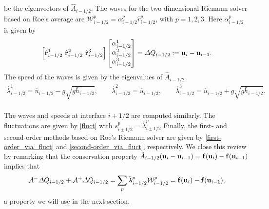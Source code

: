 \documentclass[preprint, 11pt]{article}
\newcommand{\W}{{\mathcal W}}
\newcommand{\A}{{\mathcal A}}
\newcommand{\bff}{{\bf f}}
\newcommand{\bfr}{{\bf r}}
\newcommand{\bfu}{{\bf u}}
\begin{document}
be the eigenvectors of $\hat A_{i-1/2}$.
The waves for the two-dimensional Riemann solver based on Roe's average are
$\W_{i-1/2}^p=\alpha_{i-1/2}^p\hat r_{i-1/2}^p$, with $p=1,2,3$. Here $\alpha_{i-1/2}^p$ is given by
\begin{align}\label{system_for_alphas}
  \left[\hat \bfr^1_{i-1/2} ~\hat \bfr^2_{i-1/2} ~\hat \bfr^3_{i-1/2}\right]
  \begin{bmatrix}
    \alpha^1_{i-1/2} \\
    \alpha^2_{i-1/2} \\
    \alpha^3_{i-1/2}
  \end{bmatrix}
  =\Delta Q_{i-1/2}:=\bfu_i-\bfu_{i-1}.
\end{align}
The speed of the waves is given by the eigenvalues of $\hat A_{i-1/2}$
\begin{align*}
  \hat\lambda_{i-1/2}^1=\hat u_{i-1/2}-g\sqrt{g\bar h_{i-1/2}}, \qquad
  \hat\lambda_{i-1/2}^2=\hat u_{i-1/2}, \qquad
  \hat\lambda_{i-1/2}^3=\hat u_{i-1/2}+g\sqrt{g\bar h_{i-1/2}}. \\
\end{align*}

The waves and speeds at interface $i+1/2$ are computed similarly.
The fluctuations are given by \eqref{fluct} with $s_{i\pm 1/2}^p=\hat\lambda_{i\pm 1/2}^p$
Finally, the first- and second-order methods based on Roe's Riemann solver are given by
\eqref{first-order_via_fluct} and \eqref{second-order_via_fluct}, respectively.
We close this review by remarking that the conservation property
$\hat A_{i-1/2}(\bfu_i-\bfu_{i-1})=\bff(\bfu_i)-\bff(\bfu_{i-1})$ implies that
\begin{align}\label{cons_roe}
  \A^-\Delta Q_{i-1/2}+\A^+\Delta Q_{i-1/2}=\sum_p \hat\lambda_{i-1/2}^p\W_{i-1/2}^p=\bff(\bfu_{i})-\bff(\bfu_{i-1}),
\end{align}
a property we will use in the next section.
\end{document}

